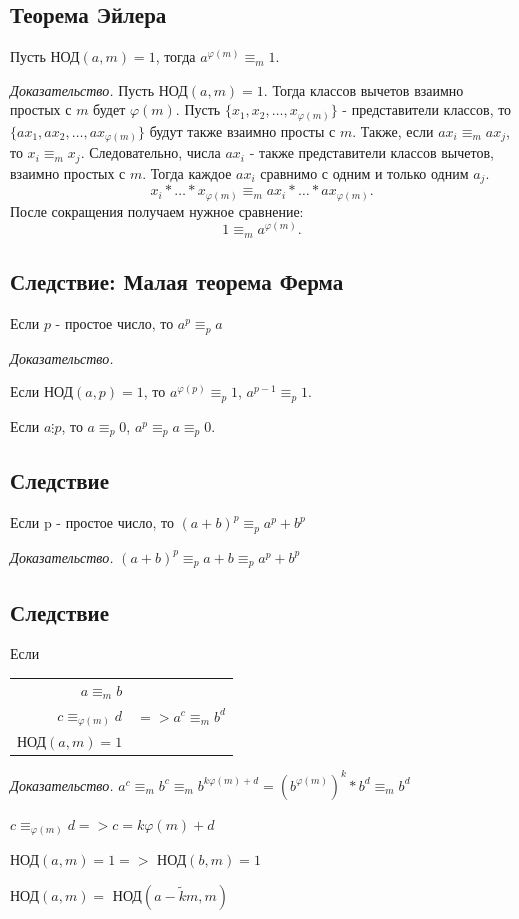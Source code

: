 \documentclass[12pt]{article}
\begin{document}
\subsection{Теорема Эйлера}
Пусть НОД$(a,m)=1$, тогда $a^{\varphi(m)}\equiv_{m}1.$
\par \textit{Доказательство.} Пусть НОД$(a,m)=1.$ Тогда классов вычетов взаимно простых с $m$ будет $\varphi(m)$. Пусть $\{x_{1},x_{2},\dots,x_{\varphi(m)}\}$ - представители классов, то $\{ax_{1},ax_{2},\dots,ax_{\varphi(m)}\}$ будут также взаимно просты с $m$. Также, если $ax_{i}\equiv_{m} ax_{j}$, то $x_{i}\equiv_{m} x_{j}.$ Следовательно, числа $ax_{i}$ - также представители классов вычетов, взаимно простых с $m$. Тогда каждое $ax_{i}$ сравнимо с одним и только одним $a_{j}$. \[x_{i}*\dots*x_{\varphi(m)}\equiv_{m} ax_{i}*\dots*ax_{\varphi(m)}.\] После сокращения получаем нужное сравнение: \[1\equiv_{m} a^{\varphi(m)}.\]

\subsection{Следствие: Малая теорема Ферма}
Если $p$ - простое число, то $a^{p}\equiv_{p}a$
\par \textit{Доказательство.}
\par Если НОД$(a,p)=1$, то $a^{\varphi(p)}\equiv_{p}1$, $a^{p-1}\equiv_{p}1$.
\par Если $a\vdots p$, то $a\equiv_{p}0$, $a^{p}\equiv_{p}a\equiv_{p}0$.

\subsection{Следствие}
Если p - простое число, то $(a+b)^{p}\equiv_{p}a^{p}+b^{p}$
\par \textit{Доказательство.} $(a+b)^{p}\equiv_{p}a+b\equiv_{p}a^{p}+b^{p}$

\subsection{Следствие}
Если
\begin{table}[h!]
    \begin{tabular}{r|c}
        $a\equiv_{m}b$                                     \\
        $c\equiv_{\varphi(m)}d$ & $=>a^{c}\equiv_{m}b^{d}$ \\
        НОД$(a,m)=1$
    \end{tabular}
\end{table}
\par \textit{Доказательство.} $a^{c}\equiv_{m}b^{c}\equiv_{m}b^{k\varphi(m)+d}=(b^{\varphi(m)})^{k}*b^{d}\equiv_{m}b^{d}$
\par $c\equiv_{\varphi(m)}d=>c=k\varphi(m)+d$
\par НОД$(a,m)=1=>$ НОД$(b,m)=1$
\par НОД$(a,m)=$ НОД$(a-\widetilde{k}m,m)$
\end{document}
